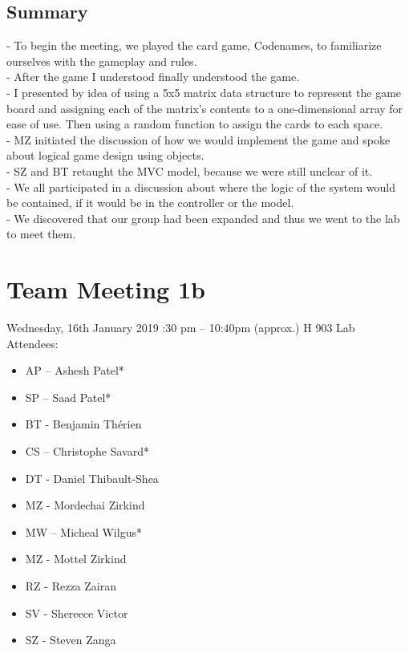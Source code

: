 \documentclass[12pt]{article}
\begin{document}
\subsection{Summary}
-	To begin the meeting, we played the card game, Codenames, to familiarize ourselves with the gameplay and rules. \\
-	After the game I understood finally understood the game. \\
-	I presented by idea of using a 5x5 matrix data structure to represent the game board and assigning each of the matrix’s contents to a one-dimensional array for ease of use. Then using a random function to assign the cards to each space. \\
-	MZ initiated the discussion of how we would implement the game and spoke about logical game design using objects.\\
-	SZ and BT retaught the MVC model, because we were still unclear of it. \\
-	We all participated in a discussion about where the logic of the system would be contained, if it would be in the controller or the model. \\
-	We discovered that our group had been expanded and thus we went to the lab to meet them. \\


\pagebreak 
\section{Team Meeting 1b }

Wednesday, 16th January 2019 :30 pm – 10:40pm (approx.) \textbar H 903 Lab\\ 
Attendees: 

 \begin{itemize}
	\item AP – Ashesh Patel*
	\item SP – Saad Patel*
	\item BT - Benjamin Th\'erien
	\item CS – Christophe Savard* 
	\item DT - Daniel Thibault-Shea
	\item MZ - Mordechai Zirkind 
	\item MW – Micheal Wilgus* 
	\item MZ - Mottel Zirkind
	\item RZ - Rezza Zairan 
	\item SV - Shereece Victor 
	\item SZ - Steven Zanga 
\end{itemize}
\end{document}
